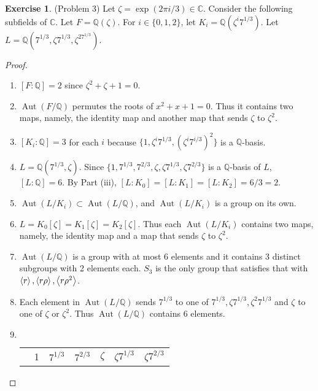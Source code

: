 \documentclass[12pt, psamsfonts]{amsart}
\theoremstyle{definition}
\newtheorem*{exer}{Exercise}
\theoremstyle{remark}
\DeclareMathOperator{\Aut}{Aut}
\numberwithin{equation}{section}
\begin{document}
\begin{exer}{(Problem 3)}
  Let $\zeta = \exp(2\pi i / 3) \in \mathbb{C}$.
  Consider the following subfields of $\mathbb{C}$.
  Let $F = \mathbb{Q}(\zeta)$.
  For $i \in \{ 0, 1, 2 \}$, let $K_i = \mathbb{Q}(\zeta^i7^{1/3})$.
  Let $L = \mathbb{Q}(7^{1/3}, \zeta7^{1/3}, \zeta^27^{1/3})$.
\end{exer}

\begin{proof}
  $ $
  \begin{enumerate}
    \item
      $[F:\mathbb{Q}] = 2$ since $\zeta^2 + \zeta + 1 = 0$.
    \item
      $\Aut(F/\mathbb{Q})$ permutes the roots of $x^2 + x + 1 = 0$.
      Thus it contains two maps, namely, the identity map and another map that sends $\zeta$ to $\zeta^2$.
    \item
      $[K_i:\mathbb{Q}] = 3$ for each $i$ because $\{ 1, \zeta^i7^{1/3}, (\zeta^{i}7^{i/3})^2 \}$ is a $\mathbb{Q}$-basis.
    \item
      $L = \mathbb{Q}(7^{1/3}, \zeta)$.
      Since $\{ 1, 7^{1/3}, 7^{2/3}, \zeta, \zeta 7^{1/3}, \zeta 7^{2/3} \}$ is a $\mathbb{Q}$-basis of $L$, $[L:\mathbb{Q}] = 6$.
      By Part (iii), $[L:K_0] = [L:K_1] = [L:K_2] = 6 / 3 = 2$.
    \item
      $\Aut(L/K_i) \subset \Aut(L/\mathbb{Q})$, and $\Aut(L/K_i)$ is a group on its own.
    \item
      $L = K_0[\zeta] = K_1[\zeta] = K_2[\zeta]$.
      Thus each $\Aut(L/K_i)$ contains two maps, namely, the identity map and a map that sends $\zeta$ to $\zeta^2$.
    \item
      $\Aut(L/\mathbb{Q})$ is a group with at most 6 elements and it contains 3 distinct subgroups with 2 elements each.
      $S_3$ is the only group that satisfies that with $\ev{ r }, \ev{ r\rho }, \ev{ r\rho^2 }$.
    \item
      Each element in $\Aut(L/\mathbb{Q})$ sends $7^{1/3}$ to one of $7^{1/3}, \zeta 7^{1/3}, \zeta^2 7^{1/3}$ and $\zeta$ to one of $\zeta$ or $\zeta^2$.
      Thus $\Aut(L/\mathbb{Q})$ contains 6 elements.
    \item
      $ $
      \begin{center}
        \begin{tabular}{ |c|c|c|c|c|c|c| }
          \hline
                                & 1 & $7^{1/3}$         & $7^{2/3}$         & $\zeta$   & $\zeta 7^{1/3}$   & $\zeta 7^{2/3}$ \\

\end{tabular}
\end{center}
\end{enumerate}
\end{proof}
\end{document}
